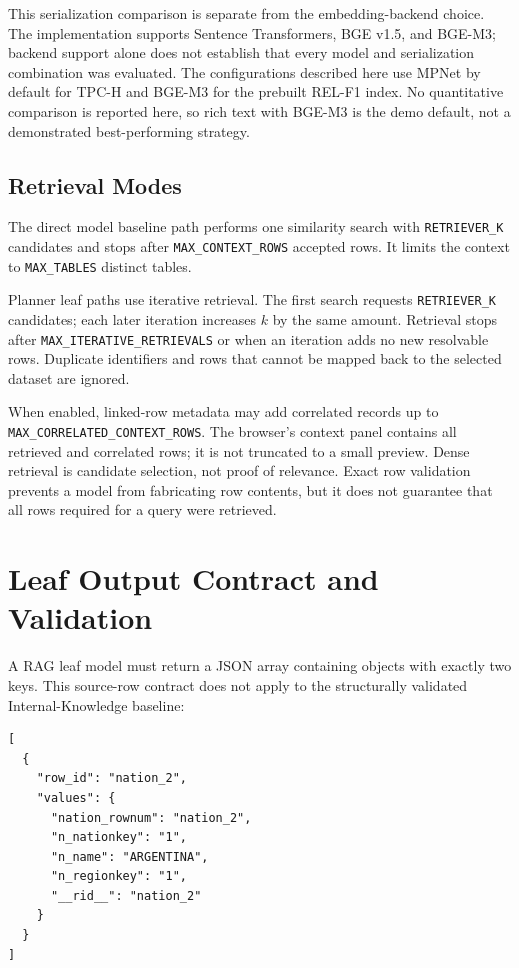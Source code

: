 \documentclass[11pt,a4paper]{article}
\newcommand{\code}[1]{\texttt{#1}}
\begin{document}
This serialization comparison is separate from the embedding-backend choice.
The implementation supports Sentence Transformers, BGE v1.5, and BGE-M3;
backend support alone does not establish that every model and serialization
combination was evaluated. The configurations described here use MPNet by
default for TPC-H and BGE-M3 for the prebuilt REL-F1 index. No quantitative
comparison is reported here, so rich text with BGE-M3 is the demo default,
not a demonstrated best-performing strategy.

\subsection{Retrieval Modes}

The direct model baseline path performs one similarity search with \code{RETRIEVER\_K}
candidates and stops after \code{MAX\_CONTEXT\_ROWS} accepted rows. It limits the
context to \code{MAX\_TABLES} distinct tables.

Planner leaf paths use iterative retrieval. The first search requests
\code{RETRIEVER\_K} candidates; each later iteration increases $k$ by the same
amount. Retrieval stops after \code{MAX\_ITERATIVE\_RETRIEVALS} or when an
iteration adds no new resolvable rows. Duplicate identifiers and rows that cannot
be mapped back to the selected dataset are ignored.

When enabled, linked-row metadata may add correlated records up to
\code{MAX\_CORRELATED\_CONTEXT\_ROWS}. The browser's context panel contains all
retrieved and correlated rows; it is not truncated to a small preview. Dense
retrieval is candidate selection, not proof of relevance. Exact row validation
prevents a model from fabricating row contents, but it does not guarantee that
all rows required for a query were retrieved.

\section{Leaf Output Contract and Validation}

A RAG leaf model must return a JSON array containing objects with exactly two
keys. This source-row contract does not apply to the structurally validated
Internal-Knowledge baseline:

\begin{lstlisting}[style=codestyle]
[
  {
    "row_id": "nation_2",
    "values": {
      "nation_rownum": "nation_2",
      "n_nationkey": "1",
      "n_name": "ARGENTINA",
      "n_regionkey": "1",
      "__rid__": "nation_2"
    }
  }
]
\end{lstlisting}
\end{document}

